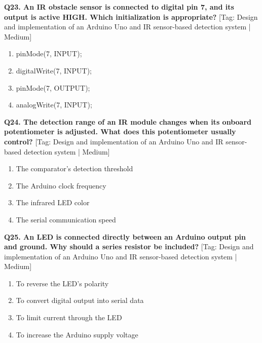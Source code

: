 \noindent\textbf{Q23. An IR obstacle sensor is connected to digital pin 7, and its output is active HIGH. Which initialization is appropriate?} \hfill [Tag: Design and implementation of an Arduino Uno and IR sensor-based detection system | Medium]
\begin{enumerate}[label=(\alph*),topsep=2pt,itemsep=1pt,partopsep=0pt,parsep=0pt]
    \item {pinMode(7, INPUT);}
    \item {digitalWrite(7, INPUT);}
    \item {pinMode(7, OUTPUT);}
    \item {analogWrite(7, INPUT);}
\end{enumerate}
\vspace{2mm}

\noindent\textbf{Q24. The detection range of an IR module changes when its onboard potentiometer is adjusted. What does this potentiometer usually control?} \hfill [Tag: Design and implementation of an Arduino Uno and IR sensor-based detection system | Medium]
\begin{enumerate}[label=(\alph*),topsep=2pt,itemsep=1pt,partopsep=0pt,parsep=0pt]
    \item {The comparator's detection threshold}
    \item {The Arduino clock frequency}
    \item {The infrared LED color}
    \item {The serial communication speed}
\end{enumerate}
\vspace{2mm}

\noindent\textbf{Q25. An LED is connected directly between an Arduino output pin and ground. Why should a series resistor be included?} \hfill [Tag: Design and implementation of an Arduino Uno and IR sensor-based detection system | Medium]
\begin{enumerate}[label=(\alph*),topsep=2pt,itemsep=1pt,partopsep=0pt,parsep=0pt]
    \item {To reverse the LED's polarity}
    \item {To convert digital output into serial data}
    \item {To limit current through the LED}
    \item {To increase the Arduino supply voltage}
\end{enumerate}
\vspace{2mm}

